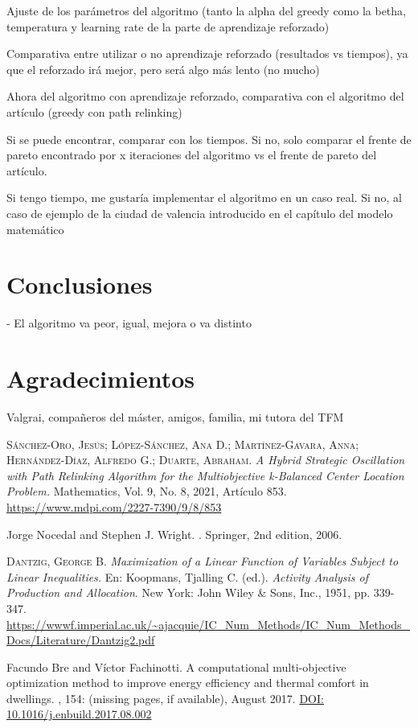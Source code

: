 \documentclass[12pt,a4paper]{book}
\begin{document}
Ajuste de los parámetros del algoritmo (tanto la alpha del greedy como la betha, temperatura y learning rate de la parte de aprendizaje reforzado)

Comparativa entre utilizar o no aprendizaje reforzado (resultados vs tiempos), ya que el reforzado irá mejor, pero será algo más lento (no mucho)

Ahora del algoritmo con aprendizaje reforzado, comparativa con el algoritmo del artículo (greedy con path relinking)

Si se puede encontrar, comparar con los tiempos. Si no, solo comparar el frente de pareto encontrado por x iteraciones del algoritmo vs el frente de pareto del artículo.

Si tengo tiempo, me gustaría implementar el algoritmo en un caso real. Si no, al caso de ejemplo de la ciudad de valencia introducido en el capítulo del modelo matemático

\chapter{Conclusiones}

- El algoritmo va peor, igual, mejora o va distinto 

\chapter{Agradecimientos}
Valgrai, compañeros del máster, amigos, familia, mi tutora del TFM


\begin{thebibliography}{X}
     \textsc{Sánchez-Oro, Jesús; López-Sánchez, Ana D.; Martínez-Gavara, Anna; Hernández-Díaz, Alfredo G.; Duarte, Abraham}. \textit{A Hybrid Strategic Oscillation with Path Relinking Algorithm for the Multiobjective k-Balanced Center Location Problem.} Mathematics, Vol. 9, No. 8, 2021, Artículo 853. \url{https://www.mdpi.com/2227-7390/9/8/853}

    Jorge Nocedal and Stephen J. Wright.
    .
    \newblock Springer, 2nd edition, 2006.

     \textsc{Dantzig, George B.} \textit{Maximization of a Linear Function of Variables Subject to Linear Inequalities.} En: Koopmans, Tjalling C. (ed.). \textit{Activity Analysis of Production and Allocation}. New York: John Wiley \& Sons, Inc., 1951, pp. 339-347. \url{https://wwwf.imperial.ac.uk/~ajacquie/IC_Num_Methods/IC_Num_Methods_Docs/Literature/Dantzig2.pdf}

    Facundo Bre and Víctor Fachinotti.
    \newblock A computational multi-objective optimization method to improve energy efficiency and thermal comfort in dwellings.
    , 154: (missing pages, if available), August 2017.
    \newblock \href{https://doi.org/10.1016/j.enbuild.2017.08.002}{DOI: 10.1016/j.enbuild.2017.08.002}
    

\end{thebibliography}
\end{document}
